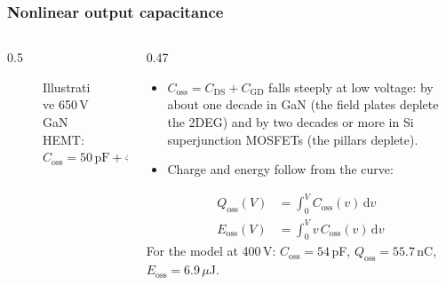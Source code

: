 \begin{frame}
	\frametitle{Nonlinear output capacitance}
	\begin{columns}[T]
		\begin{column}{0.5\textwidth}
			\begin{figure}
				\centering
				\caption{Illustrative 650\,V GaN HEMT: $C_\mathrm{oss}=50\,\mathrm{pF}+434\,\mathrm{pF}\cdot e^{-v_\mathrm{DS}/83\,\mathrm{V}}$}
			\end{figure}
		\end{column}
		\begin{column}{0.47\textwidth}
			\begin{itemize}
				\item $C_\mathrm{oss}=C_\mathrm{DS}+C_\mathrm{GD}$ falls steeply at low voltage: by about one decade in GaN (the field plates deplete the 2DEG) and by two decades or more in Si superjunction MOSFETs (the pillars deplete).
				\item Charge and energy follow from the curve:
			\end{itemize}
			\begin{align*}
				Q_\mathrm{oss}(V) & = \int_0^V C_\mathrm{oss}(v)\,\mathrm{d}v \\
				E_\mathrm{oss}(V) & = \int_0^V v\,C_\mathrm{oss}(v)\,\mathrm{d}v
			\end{align*}
			For the model at 400\,V: $C_\mathrm{oss}=54$\,pF, $Q_\mathrm{oss}=55.7$\,nC, $E_\mathrm{oss}=6.9\,\mu$J.
		\end{column}
	\end{columns}
\end{frame}


